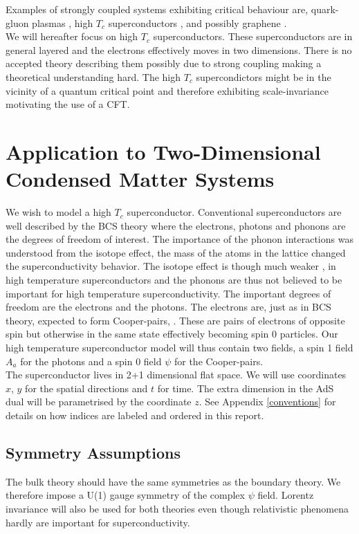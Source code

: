 \documentclass[12pt]{report}
\begin{document}
Examples of strongly coupled systems exhibiting critical behaviour are, quark-gluon plasmas \cite{PhysRevD.73.045013}, high $T_c$ superconductors \cite{hartnoll8}, and possibly graphene \cite{hartnoll8}.\\

We will hereafter focus on high $T_c$ superconductors. These superconductors are in general layered and the electrons effectively moves in two dimensions. There is no accepted theory describing them possibly due to strong coupling making a theoretical understanding hard. The high $T_c$ supercondictors might be in the vicinity of a quantum critical point \cite{dome} and therefore exhibiting scale-invariance motivating the use of a CFT.

\chapter{Application to Two-Dimensional Condensed Matter Systems}
We wish to model a high $T_c$ superconductor. Conventional superconductors are well described by the BCS theory where the electrons, photons and phonons are the degrees of freedom of interest. The importance of the phonon interactions was understood from the isotope effect, the mass of the atoms in the lattice changed the superconductivity behavior. The isotope effect is though much weaker \cite{leggett2006we}, in high temperature superconductors and the phonons are thus not believed to be important for high temperature superconductivity. The important degrees of freedom are the electrons and the photons. The electrons are, just as in BCS theory, expected to form Cooper-pairs, \cite{leggett2006we}. These are pairs of electrons of opposite spin but otherwise in the same state effectively becoming spin 0 particles. Our high temperature superconductor model will thus contain two fields, a spin 1 field $A_a$ for the photons and a spin 0 field $\psi$ for the Cooper-pairs.\\

The superconductor lives in 2+1 dimensional flat space. We will use coordinates $x$, $y$ for the spatial directions and $t$ for time. The extra dimension in the AdS dual will be parametrised by the coordinate $z$. See Appendix \ref{conventions} for details on how indices are labeled and ordered in this report. 
\section{Symmetry Assumptions}
The bulk theory should have the same symmetries as the boundary theory. We therefore impose a U(1) gauge symmetry of the complex $\psi$ field. Lorentz invariance will also be used for both theories even though relativistic phenomena hardly are important for superconductivity.
\end{document}
